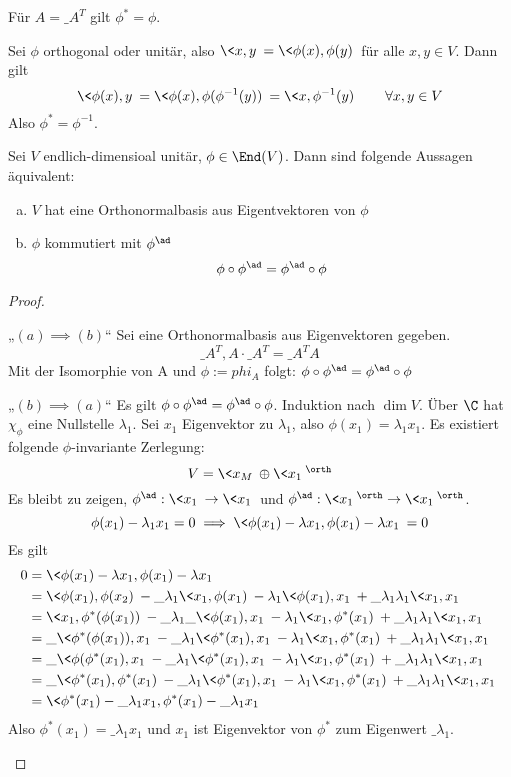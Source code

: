 \documentclass[a4paper, 10pt]{scrbook}
\begin{document}
\begin{ex}
	Für $A=\_A^T$ gilt $\phi^* = \phi$.

	Sei $\phi$ orthogonal oder unitär, also $\<x,y\> = \<\phi(x),\phi(y)\>$ für alle $x,y\in V$.
	Dann gilt
	\[
		\<\phi(x),y\> = \<\phi(x),\phi(\phi^{-1}(y))\> = \<x, \phi^{-1}(y)\> \qquad \forall x,y\in V
	\]
	Also $\phi^* = \phi^{-1}$.
\end{ex}

\begin{thm}
	\label{thm:13.25}
	Sei $V$ endlich-dimensioal unitär, $\phi\in \End(V)$.
	Dann sind folgende Aussagen äquivalent:
	\begin{enumerate}[(a)]
		\item
			$V$ hat eine Orthonormalbasis aus Eigentvektoren von $\phi$
		\item
			$\phi$ kommutiert mit $\phi^{\ad}$
			\[
				\phi \circ \phi^{\ad} = \phi^{\ad} \circ \phi
			\]
	\end{enumerate}
	\begin{proof}
		\begin{seg}{„$(a)\implies (b)$“}
			Sei eine Orthonormalbasis aus Eigenvektoren gegeben.
			\[
				\_A^T, A\cdot \_A^T = \_A^T A
			\]
			Mit der Isomorphie von A und $\phi:=phi_A$ folgt: $\phi\circ \phi^{\ad} = \phi^{\ad}\circ \phi$
		\end{seg}
		\begin{seg}{„$(b)\implies (a)$“}
			Es gilt $\phi \circ \phi^{\ad} = \phi^{\ad}\circ \phi$.
			Induktion nach $\dim V$.
			Über $\C$ hat $\chi_\phi$ eine Nullstelle $\lambda_1$.
			Sei $x_1$ Eigenvektor zu $\lambda_1$, also $\phi(x_1) = \lambda_1 x_1$.
			Es existiert folgende $\phi$-invariante Zerlegung:
			\[
				V = \<x_M\>  \oplus \<x_1\>^\orth
			\]
			Es bleibt zu zeigen, $\phi^{\ad}: \<x_1\> \to \<x_1\>$ und $\phi^{\ad}: \<x_1\>^\orth \to \<x_1\>^\orth$.
			\[
				\phi(x_1) -\lambda_1 x_1 = 0 \implies \<\phi(x_1)-\lambda x_1, \phi(x_1) - \lambda x_1\> = 0
			\]
			Es gilt
			\begin{align*}
				0 &= \<\phi(x_1)-\lambda x_1, \phi(x_1) - \lambda x_1\> \\
				  &= \<\phi(x_1),\phi(x_2)\> - \_\lambda_1 \<x_1,\phi(x_1)\> - \lambda_1 \<\phi(x_1), x_1\> + \_\lambda_1\lambda_1\<x_1,x_1\>\\
				  &= \<x_1,\phi^*(\phi(x_1))\> - \_\lambda_1\_{\<\phi(x_1),x_1\>} - \lambda_1\<x_1,\phi^*(x_1)\> + \_\lambda_1\lambda_1 \<x_1,x_1\>\\
				  &= \_{\<\phi^*(\phi(x_1)),x_1\>} - \_\lambda_1 \<\phi^*(x_1),x_1\> - \lambda_1\<x_1,\phi^*(x_1)\> + \_\lambda_1\lambda_1 \<x_1,x_1\>\\
				  &= \_{\<\phi(\phi^*(x_1),x_1\>} - \_\lambda_1\<\phi^*(x_1),x_1\> - \lambda_1\<x_1,\phi^*(x_1)\> + \_\lambda_1\lambda_1\<x_1,x_1\>\\
				  &= \_{\<\phi^*(x_1),\phi^*(x_1)\>} - \_\lambda_1 \<\phi^*(x_1),x_1\> - \lambda_1 \<x_1,\phi^*(x_1)\> + \_\lambda_1\lambda_1 \<x_1,x_1\>\\
				  &= \<\phi^*(x_1)-\_\lambda_1x_1, \phi^*(x_1)-\_\lambda_1x_1\>
			\end{align*}
			Also $\phi^*(x_1) = \_\lambda_1 x_1$ und $x_1$ ist Eigenvektor von $\phi^*$ zum Eigenwert $\_\lambda_1$.


\end{seg}
\end{proof}
\end{thm}
\end{document}

